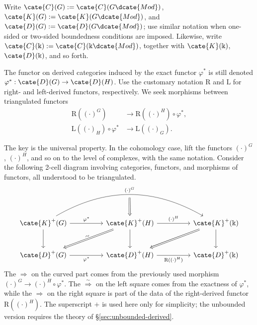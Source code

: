 \begin{convention}
	Write $\cate{C}(G):=\cate{C}(G\dcate{Mod})$,
	$\cate{K}(G):=\cate{K}(G\dcate{Mod})$, and
	$\cate{D}(G):=\cate{D}(G\dcate{Mod})$; use similar notation when
	one-sided or two-sided boundedness conditions are imposed. Likewise, write
	$\cate{C}(\Bbbk):=\cate{C}(\Bbbk\dcate{Mod})$, together with
	$\cate{K}(\Bbbk)$, $\cate{D}(\Bbbk)$, and so forth.
\end{convention}

The functor on derived categories induced by the exact functor $\varphi^*$ is
still denoted
$\varphi^*:\cate{D}(G)\to\cate{D}(H)$. Use the customary notation
$\mathrm{R}$ and $\mathrm{L}$ for right- and left-derived functors,
respectively. We seek morphisms between triangulated functors
\begin{align*}
	\mathrm{R}\left( (\cdot)^G \right) & \to \mathrm{R}\left( (\cdot)^H \right) \circ \varphi^* , \\
	\mathrm{L}\left( (\cdot)_H \right) \circ \varphi^* & \to \mathrm{L}\left((\cdot)_G \right).
\end{align*}

The key is the universal property. In the cohomology case, lift the functors
$(\cdot)^G$, $(\cdot)^H$, and so on to the level of complexes, with the same
notation. Consider the following 2-cell diagram involving categories,
functors, and morphisms of functors, all understood to be triangulated.
\begin{equation}\label{eqn:grp-pullback-2-cell}
	\begin{tikzcd}[column sep=huge, row sep=large]
		\cate{K}^+(G) \arrow[d] \arrow[r, "{\varphi^*}"] \arrow[rr, bend left, "{(\cdot)^G}", "{}"' {name=U}] & \cate{K}^+(H) \arrow[d] \arrow[r, "{(\cdot)^H}"] \arrow[from=U, Rightarrow] \arrow[Rightarrow, ld, "\sim" sloped] & \cate{K}^+(\Bbbk) \arrow[d] \arrow[Rightarrow, ld] \\
		\cate{D}^+(G) \arrow[r, "{\varphi^*}"'] & \cate{D}^+(H) \arrow[r, "{\mathrm{R}((\cdot)^H)}"'] & \cate{D}^+(\Bbbk)
	\end{tikzcd}
\end{equation}
The $\Rightarrow$ on the curved part comes from the previously used morphism
$(\cdot)^G\to(\cdot)^H\circ\varphi^*$. The
$\stackrel{\sim}{\Rightarrow}$ on the left square comes from the exactness of
$\varphi^*$, while the $\Rightarrow$ on the right square is part of the data
of the right-derived functor $\mathrm{R}((\cdot)^H)$. The superscript $+$ is
used here only for simplicity; the unbounded version requires the theory of
\S\ref{sec:unbounded-derived}.

